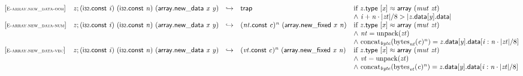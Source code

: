 $$
\begin{array}{@{}l@{}lcl@{}l@{}}
{[\textsc{\scriptsize E{-}array.new\_data{-}oob}]} \quad & {\mathit{z}} ; (\mathsf{i{\scriptstyle32}}.\mathsf{const}~{\mathit{i}})~(\mathsf{i{\scriptstyle32}}.\mathsf{const}~{\mathit{n}})~(\mathsf{array.new\_data}~{\mathit{x}}~{\mathit{y}}) &\hookrightarrow& \mathsf{trap} &\quad
  \mbox{if}~{\mathit{z}}.\mathsf{type}~[{\mathit{x}}] \approx \mathsf{array}~({\mathit{mut}}~{\mathit{zt}}) \\
 &&&&\quad {\land}~{\mathit{i}} + {\mathit{n}} \cdot {|{\mathit{zt}}|} / 8 > {|{{\mathit{z}}.\mathsf{data}}{[{\mathit{y}}]}.\mathsf{data}|} \\
{[\textsc{\scriptsize E{-}array.new\_data{-}num}]} \quad & {\mathit{z}} ; (\mathsf{i{\scriptstyle32}}.\mathsf{const}~{\mathit{i}})~(\mathsf{i{\scriptstyle32}}.\mathsf{const}~{\mathit{n}})~(\mathsf{array.new\_data}~{\mathit{x}}~{\mathit{y}}) &\hookrightarrow& {({\mathit{nt}}.\mathsf{const}~{\mathit{c}})^{{\mathit{n}}}}~(\mathsf{array.new\_fixed}~{\mathit{x}}~{\mathit{n}}) &\quad
  \mbox{if}~{\mathit{z}}.\mathsf{type}~[{\mathit{x}}] \approx \mathsf{array}~({\mathit{mut}}~{\mathit{zt}}) \\
 &&&&\quad {\land}~{\mathit{nt}} = {\mathrm{unpack}}({\mathit{zt}}) \\
 &&&&\quad {\land}~{{\mathrm{concat}}}_{{\mathit{byte}}}({{{\mathrm{bytes}}}_{{\mathit{nt}}}({\mathit{c}})^{{\mathit{n}}}}) = {{\mathit{z}}.\mathsf{data}}{[{\mathit{y}}]}.\mathsf{data}[{\mathit{i}} : {\mathit{n}} \cdot {|{\mathit{zt}}|} / 8] \\
{[\textsc{\scriptsize E{-}array.new\_data{-}vec}]} \quad & {\mathit{z}} ; (\mathsf{i{\scriptstyle32}}.\mathsf{const}~{\mathit{i}})~(\mathsf{i{\scriptstyle32}}.\mathsf{const}~{\mathit{n}})~(\mathsf{array.new\_data}~{\mathit{x}}~{\mathit{y}}) &\hookrightarrow& {({\mathit{vt}}.\mathsf{const}~{\mathit{c}})^{{\mathit{n}}}}~(\mathsf{array.new\_fixed}~{\mathit{x}}~{\mathit{n}}) &\quad
  \mbox{if}~{\mathit{z}}.\mathsf{type}~[{\mathit{x}}] \approx \mathsf{array}~({\mathit{mut}}~{\mathit{zt}}) \\
 &&&&\quad {\land}~{\mathit{vt}} = {\mathrm{unpack}}({\mathit{zt}}) \\
 &&&&\quad {\land}~{{\mathrm{concat}}}_{{\mathit{byte}}}({{{\mathrm{bytes}}}_{{\mathit{vt}}}({\mathit{c}})^{{\mathit{n}}}}) = {{\mathit{z}}.\mathsf{data}}{[{\mathit{y}}]}.\mathsf{data}[{\mathit{i}} : {\mathit{n}} \cdot {|{\mathit{zt}}|} / 8] \\
\end{array}
$$


